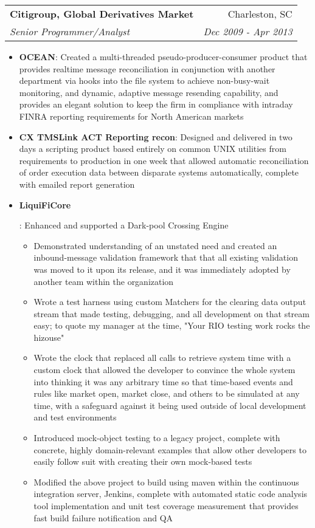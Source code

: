 \documentclass[letterpaper,10pt]{article}
\makeatletter
\newcommand{\resumeItem}[2]{
  \item\small{
    \textbf{#1}{: #2 \vspace{-2pt}}
  }
}
\newcommand{\resumeSubheading}[4]{
  \vspace{-1pt}\item[]
  \begin{tabular*}{0.98\textwidth}{l@{\extracolsep{\fill}}r}
      \hspace{-10pt}\textbf{#1} & #2 \\
      \hspace{-10pt}\textit{\small#3} & \textit{\small #4} \\
    \end{tabular*}\vspace{-5pt}
}
\newcommand{\resumeItemListStart}{\begin{itemize}}
\newcommand{\resumeItemListEnd}{\end{itemize}\vspace{-5pt}}
\makeatother
\begin{document}
    \resumeSubheading
      {Citigroup, Global Derivatives Market}{Charleston, SC}
      {Senior Programmer/Analyst}{Dec 2009 - Apr 2013}
      \resumeItemListStart
        \resumeItem{OCEAN}
          {Created a multi-threaded pseudo-producer-consumer product that provides realtime message reconciliation in conjunction with another department via hooks into the file system to achieve non-busy-wait monitoring, and dynamic, adaptive message resending capability, and provides an elegant solution to keep the firm in compliance with intraday FINRA reporting requirements for North American markets}
        \resumeItem{CX TMSLink ACT Reporting recon}
          {Designed and delivered in two days a scripting product based entirely on common UNIX utilities from requirements to production in one week that allowed automatic reconciliation of order execution data between disparate systems automatically, complete with emailed report generation}
        \resumeItem{LiquiFiCore}
          {Enhanced and supported a Dark-pool Crossing Engine
            \begin{itemize}
                \item Demonstrated understanding of an unstated need and created an inbound-message validation framework that that all existing validation was moved to it upon its release, and it was immediately adopted by another team within the organization
                \item Wrote a test harness using custom Matchers for the clearing data output stream that made testing, debugging, and all development on that stream easy; to quote my manager at the time, "Your RIO testing work rocks the hizouse"
                \item Wrote the clock that replaced all calls to retrieve system time with a custom clock that allowed the developer to convince the whole system into thinking it was any arbitrary time so that time-based events and rules like market open, market close, and others to be simulated at any time, with a safeguard against it being used outside of local development and test environments
                \item Introduced mock-object testing to a legacy project, complete with concrete, highly domain-relevant examples that allow other developers to easily follow suit with creating their own mock-based tests
                \item Modified the above project to build using maven within the continuous integration server, Jenkins, complete with automated static code analysis tool implementation and unit test coverage measurement that provides fast build failure notification and QA
            \end{itemize}
          }
      \resumeItemListEnd
\end{document}

